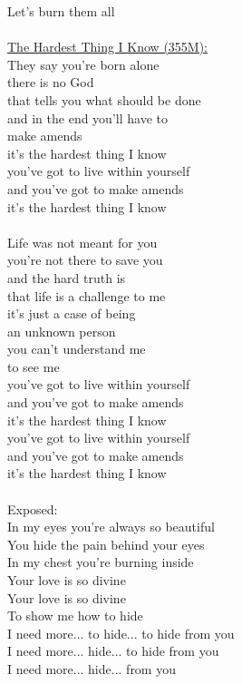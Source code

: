 \documentclass[11pt]{article}
\begin{document}
Let's burn them all\\
\\
\underline{The Hardest Thing I Know (355M):}\\
They say you're born alone\\
there is no God\\
that tells you what should be done\\
and in the end you'll have to\\
make amends\\
it's the hardest thing I know\\
you've got to live within yourself\\
and you've got to make amends\\
it's the hardest thing I know\\
\\
Life was not meant for you\\
you're not there to save you\\
and the hard truth is\\
that life is a challenge to me\\
it's just a case of being\\
an unknown person\\
you can't understand me\\
to see me\\
you've got to live within yourself\\
and you've got to make amends\\
it's the hardest thing I know\\
you've got to live within yourself\\
and you've got to make amends\\
it's the hardest thing I know\\
\\
Exposed:\\
In my eyes you're always so beautiful\\
You hide the pain behind your eyes\\
In my chest you're burning inside\\
Your love is so divine\\
Your love is so divine\\
To show me how to hide\\
I need more... to hide... to hide from you\\
I need more... hide... to hide from you\\
I need more... hide... from you\\
\\
\end{document}
